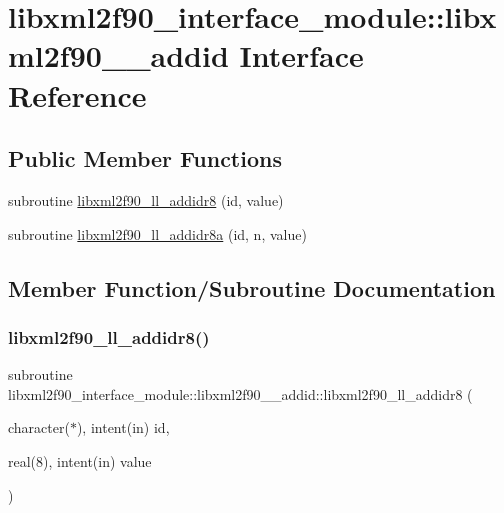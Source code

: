 \hypertarget{interfacelibxml2f90__interface__module_1_1libxml2f90____addid}{}\section{libxml2f90\+\_\+interface\+\_\+module\+:\+:libxml2f90\+\_\+\+\_\+addid Interface Reference}
\label{interfacelibxml2f90__interface__module_1_1libxml2f90____addid}
\subsection*{Public Member Functions}
\begin{DoxyCompactItemize}
\item 
subroutine \hyperlink{interfacelibxml2f90__interface__module_1_1libxml2f90____addid_acecc86afe5b5de9df74cfb9d4baf129a}{libxml2f90\+\_\+ll\+\_\+addidr8} (id, value)
\item 
subroutine \hyperlink{interfacelibxml2f90__interface__module_1_1libxml2f90____addid_abb6ee1f76f80fab72d6b6e6c9ed66a66}{libxml2f90\+\_\+ll\+\_\+addidr8a} (id, n, value)
\end{DoxyCompactItemize}


\subsection{Member Function/\+Subroutine Documentation}
\mbox{\label{interfacelibxml2f90__interface__module_1_1libxml2f90____addid_acecc86afe5b5de9df74cfb9d4baf129a}} 
\subsubsection{\texorpdfstring{libxml2f90\+\_\+ll\+\_\+addidr8()}{libxml2f90\_ll\_addidr8()}}
{\footnotesize\ttfamily subroutine libxml2f90\+\_\+interface\+\_\+module\+::libxml2f90\+\_\+\+\_\+addid\+::libxml2f90\+\_\+ll\+\_\+addidr8 (\begin{DoxyParamCaption}\item[{character($\ast$), intent(in)}]{id,  }\item[{real(8), intent(in)}]{value }\end{DoxyParamCaption})}

